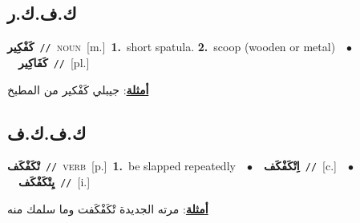 \documentclass[10pt,a4paper,twoside]{article} %
\begin{document}
\begin{multicols}{2}
\vspace{-3mm}
\subsection*{\color{blue}\foreignlanguage{arabic}{ك.ف.ك.ر}\color{blue}{}} 

{\setlength\topsep{0pt}\textbf{\foreignlanguage{arabic}{كَفْكِير}}\ {\color{gray}\texttt{//}\color{black}}\ \textsc{noun}\ [m.]\ \textbf{1.}~short spatula.  \textbf{2.}~scoop (wooden or metal)\ \ $\bullet$\ \ \setlength\topsep{0pt}\textbf{\foreignlanguage{arabic}{كَفَاكِير}}\ {\color{gray}\texttt{//}\color{black}}\ [pl.]\  \begin{flushright}\color{gray}\foreignlanguage{arabic}{\textbf{\underline{\foreignlanguage{arabic}{أمثلة}}}: جيبلي كَفْكير من المطبخ}\end{flushright}\color{black}} \vspace{2mm}

\vspace{-3mm}
\subsection*{\color{blue}\foreignlanguage{arabic}{ك.ف.ك.ف}\color{blue}{}} 

{\setlength\topsep{0pt}\textbf{\foreignlanguage{arabic}{تْكَفْكَف}}\ {\color{gray}\texttt{//}\color{black}}\ \textsc{verb}\ [p.]\ \textbf{1.}~be slapped repeatedly\ \ $\bullet$\ \ \setlength\topsep{0pt}\textbf{\foreignlanguage{arabic}{اِتْكَفْكَف}}\ {\color{gray}\texttt{//}\color{black}}\ [c.]\ \ $\bullet$\ \ \setlength\topsep{0pt}\textbf{\foreignlanguage{arabic}{يِتْكَفْكَف}}\ {\color{gray}\texttt{//}\color{black}}\ [i.]\  \begin{flushright}\color{gray}\foreignlanguage{arabic}{\textbf{\underline{\foreignlanguage{arabic}{أمثلة}}}: مرته الجديدة تْكَفْكَفت وما سلمك منه}\end{flushright}\color{black}} \vspace{2mm}


\end{multicols}
\end{document}
